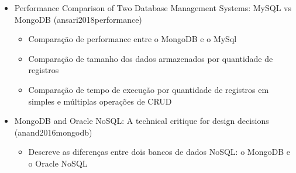 \begin{itemize}
    \item Performance Comparison of Two Database Management Systems: MySQL vs MongoDB (ansari2018performance)
    
        \begin{itemize}
            \item Comparação de performance entre o  MongoDB e o MySql
            \item Comparação de tamanho dos dados armazenados por quantidade de registros
            \item Comparação de tempo de execução por quantidade de registros em simples e múltiplas operações de CRUD
        \end{itemize}
        
    \item MongoDB and Oracle NoSQL: A technical critique for design decisions (anand2016mongodb)
    
        \begin{itemize}
            \item Descreve as diferenças entre dois bancos de dados NoSQL: o  MongoDB e o Oracle NoSQL
        \end{itemize}
\end{itemize}